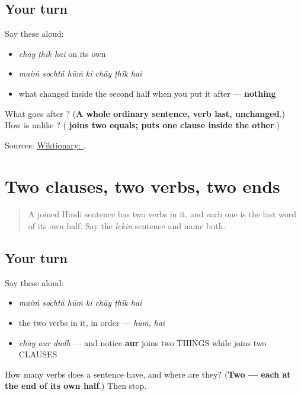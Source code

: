 \subsection*{Your turn}
Say these aloud:

\begin{itemize}
\raggedright
  \item \emph{chāy ṭhīk hai} on its own
  \item \emph{maiṁ sochtā hūṁ ki chāy ṭhīk hai}
  \item what changed inside the second half when you put it after \textbf{} — \textbf{nothing}
\end{itemize}

\begin{tcolorbox}[breakable,colback=teal!4,colframe=teal!35!black,title={Before you move on}]
What goes after \textbf{}? (\textbf{A whole ordinary sentence, verb last, unchanged}.) How is \textbf{} unlike \textbf{}? (\textbf{ joins two equals;  puts one clause inside the other}.)

Sources: \href{https://en.wiktionary.org/wiki/\%E0\%A4\%95\%E0\%A4\%BF}{Wiktionary: }.
\end{tcolorbox}
\section[\texorpdfstring{… \hi{कि} … (… ki …)}{… कि … (… ki …)}]{Two clauses, two verbs, two ends}

\label{lesson:HI-R69-reported}



\begin{quote}
A joined Hindi sentence has two verbs in it, and each one is the last word of its own half. Say the \emph{lekin} sentence and name both.
\end{quote}

\subsection*{Your turn}
Say these aloud:

\begin{itemize}
\raggedright
  \item \emph{maiṁ sochtā hūṁ ki chāy ṭhīk hai}
  \item the two verbs in it, in order — \emph{hūṁ}, \emph{hai}
  \item \emph{chāy aur dūdh} — and notice \textbf{aur} joins two THINGS while \textbf{} joins two CLAUSES
\end{itemize}

\begin{tcolorbox}[breakable,colback=teal!4,colframe=teal!35!black,title={Before you move on}]
How many verbs does a \textbf{} sentence have, and where are they? (\textbf{Two — each at the end of its own half}.) Then stop.
\end{tcolorbox}
